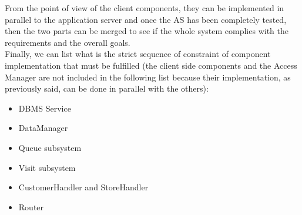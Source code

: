 \documentclass[]{article}
\begin{document}
From the point of view of the client components, they can be implemented in parallel to the application server and once the AS has been completely tested, then the two parts can be merged to see if the whole system complies with the requirements and the overall goals.\\ \newline
Finally, we can list what is the strict sequence of constraint of component implementation that must be fulfilled (the client side components and the Access Manager are not included in the following list because their implementation, as previously said, can be done in parallel with the others): 
				\begin{itemize}
					\item DBMS Service
					\item DataManager
					\item Queue subsystem
					\item Visit subsystem
					\item CustomerHandler and StoreHandler
					\item Router
				\end{itemize} 
				\textbf{} \newpage	
				
				
\end{document}
